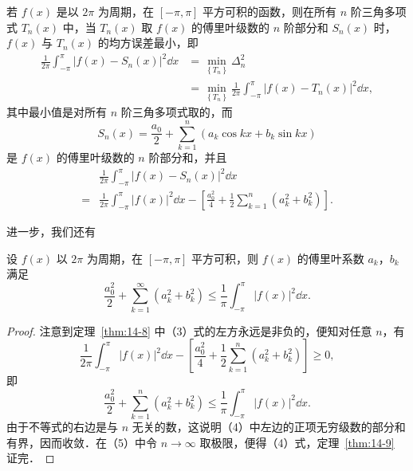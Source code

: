 \begin{theorem}\label{thm:14-8}
若 $f(x)$ 是以 $2\pi$ 为周期，在 $[-\pi,\pi]$ 平方可积的函数，则在所有 $n$ 阶三角多项式 $T_{n}(x)$ 中，当 $T_{n}(x)$ 取 $f(x)$ 的傅里叶级数的 $n$ 阶部分和 $S_{n}(x)$ 时，$f(x)$ 与 $T_{n}(x)$ 的均方误差最小，即
\begin{equation}
\begin{aligned}
\frac{1}{2\pi}\int_{-\pi}^{\pi}\left|f(x)-S_{n}(x)\right|^{2}\dd x&=\min_{\left\{T_{n}\right\}}\Delta_{n}^{2}\\
&=\min_{\left\{T_{n}\right\}}\frac{1}{2\pi}\int_{-\pi}^{\pi}\left|f(x)-T_{n}(x)\right|^{2}\dd x,
\end{aligned}
\tag{2}
\end{equation}
其中最小值是对所有 $n$ 阶三角多项式取的，而
\[
S_{n}(x)=\frac{a_{0}}{2}+\sum_{k=1}^{n}\left(a_{k}\cos kx+b_{k}\sin kx\right)
\]
是 $f(x)$ 的傅里叶级数的 $n$ 阶部分和，并且
\begin{equation}
\begin{aligned}
&\frac{1}{2\pi}\int_{-\pi}^{\pi}\left|f(x)-S_{n}(x)\right|^{2}\dd x\\
={}&\frac{1}{2\pi}\int_{-\pi}^{\pi}\left|f(x)\right|^{2}\dd x-\left[\frac{a_{0}^{2}}{4}+\frac{1}{2}\sum_{k=1}^{n}\left(a_{k}^{2}+b_{k}^{2}\right)\right].
\end{aligned}
\tag{3}
\end{equation}
\end{theorem}

进一步，我们还有

\begin{theorem}\label{thm:14-9}
设 $f(x)$ 以 $2\pi$ 为周期，在 $[-\pi,\pi]$ 平方可积，则 $f(x)$ 的傅里叶系数 $a_{k}$，$b_{k}$ 满足
\begin{equation}
\frac{a_{0}^{2}}{2}+\sum_{k=1}^{\infty}\left(a_{k}^{2}+b_{k}^{2}\right)\leqslant\frac{1}{\pi}\int_{-\pi}^{\pi}\left|f(x)\right|^{2}\dd x.
\tag{4}
\end{equation}
\end{theorem}

\begin{proof}
注意到定理~\ref{thm:14-8} 中（3）式的左方永远是非负的，便知对任意 $n$，有
\[
\frac{1}{2\pi}\int_{-\pi}^{\pi}\left|f(x)\right|^{2}\dd x-\left[\frac{a_{0}^{2}}{4}+\frac{1}{2}\sum_{k=1}^{n}\left(a_{k}^{2}+b_{k}^{2}\right)\right]\geqslant 0,
\]
即
\begin{equation}
\frac{a_{0}^{2}}{2}+\sum_{k=1}^{n}\left(a_{k}^{2}+b_{k}^{2}\right)\leqslant\frac{1}{\pi}\int_{-\pi}^{\pi}\left|f(x)\right|^{2}\dd x.
\tag{5}
\end{equation}
由于不等式的右边是与 $n$ 无关的数，这说明（4）中左边的正项无穷级数的部分和有界，因而收敛．在（5）中令 $n\to\infty$ 取极限，便得（4）式，定理~\ref{thm:14-9} 证完．
\end{proof}


